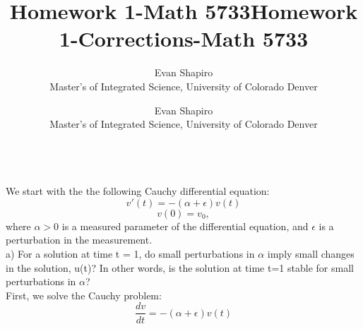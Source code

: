 \documentclass{article}
\title{Homework 1-Math 5733}
\author{Evan Shapiro \\ Master's of Integrated Science, University of Colorado Denver}
\begin{document}
\title{Homework 1-Corrections-Math 5733}
\author{Evan Shapiro \\ Master's of Integrated Science, University of Colorado Denver}
\\
We start with the the following Cauchy differential equation:
\[ v'(t)= - (\alpha + \epsilon)v(t) \]
\[ v(0) = v_{0}, \]
where \(\alpha > 0\) is a measured parameter of the differential equation, and \(\epsilon\) is a perturbation in the measurement.\\
a) For a solution at time t = 1, do small perturbations in \(\alpha\) imply small changes in the solution, u(t)? In other words, is the solution at time t=1 stable for small perturbations in \(\alpha\)?\\
First, we solve the Cauchy problem:
\[ \frac{dv}{dt} = -(\alpha + \epsilon)v(t)\]
\end{document}

